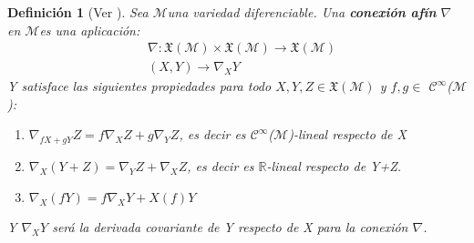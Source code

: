 \documentclass[pdftex,11pt,a4paper]{book}
\newtheorem{defi}{Definici\'on}
\newcommand{\M}{$\mathscr{M}$}
\newcommand{\Cinf}{ $\mathscr{C}^\infty$}
\newcommand{\R}{$\mathbb{R}$}
\begin{document}
\begin{defi}[Ver \cite{DoCarmoRiemann}]
Sea \M una variedad diferenciable. Una \textbf{conexión afín} $\nabla$ en \M es una aplicación:
\begin{equation*}
\begin{array}{cc}
     & \nabla: \mathfrak{X}(\mathcal{M})\times \mathfrak{X}(\mathcal{M}) \to  \mathfrak{X}(\mathcal{M}) \\
     & (X,Y) \to \nabla_XY 
\end{array}
\end{equation*}
Y satisface las siguientes propiedades para todo $X,Y,Z \in \mathfrak{X}(\mathcal{M}) $ y $f,g \in$\Cinf(\M):
\begin{enumerate}
    \item $\nabla_{fX+gY}Z=f\nabla_XZ + g \nabla_YZ$, es decir es \Cinf(\M)-lineal respecto de X
    \item $\nabla_X(Y+Z)=\nabla_YZ+\nabla_XZ  $, es decir es \R-lineal respecto de Y+Z. 
    \item $\nabla_X(fY)= f\nabla_X Y + X(f)Y$
\end{enumerate}
Y $\nabla_XY$ será la derivada covariante de Y respecto de X para la conexión $\nabla$.

\end{defi}
\end{document}

